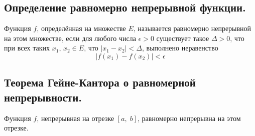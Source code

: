 

\label{sec_Definition03}
\begin{definition}
    \subsection*{Определение равномерно непрерывной функции.}
    \begin{note}[purple]
        Функция $f$, определённая на множестве $E$, называется
        равномерно непрерывной на этом множестве, если для любого числа
        $\epsilon > 0$ существует такое $\Delta > 0$, что при всех
        таких $x_1, \, x_2 \in E$, что $|x_1 - x_2| < \Delta$, 
        выполнено неравенство
        $$
            |f(x_1) - f(x_2)| < \epsilon
        $$
    \end{note}
    \subsection*{Теорема Гейне-Кантора о равномерной непрерывности.}
    \begin{note}[purple]
        Функция $f$, непрерывная на отрезке $[a, \; b]$, 
        равномерно непрерывна на этом отрезке.
    \end{note}
\end{definition}